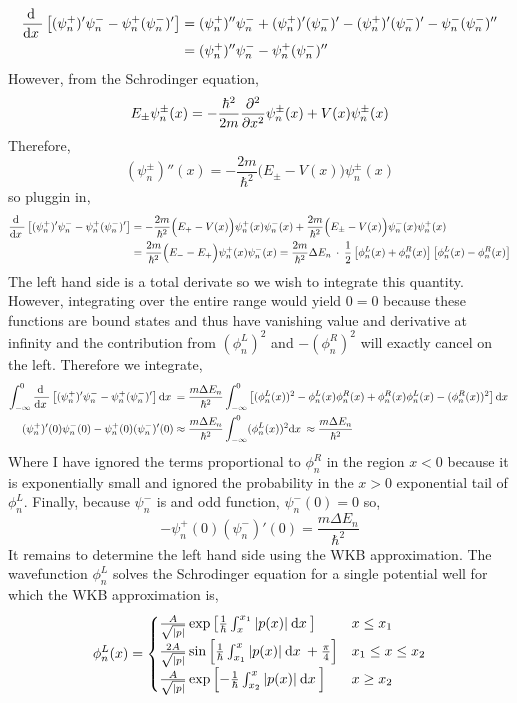 \documentclass[12pt]{extarticle}
\newcommand{\pL}{\phi^L_n}
\newcommand{\pR}{\phi^R_n}
\newcommand{\pspm}{\psi_{n}^{\pm}}
\newcommand{\psp}{\psi_{n}^{+}}
\newcommand{\psm}{\psi_{n}^{-}}
\newcommand{\dpsp}{(\psi_{n}^{+})'}
\newcommand{\dpsm}{(\psi_{n}^{-})'}
\newcommand{\ddpsp}{(\psi_{n}^{+})''}
\newcommand{\ddpsm}{(\psi_{n}^{-})''}
\begin{document}
\begin{align*}
\deriv{}{x} \left[ \dpsp \psm - \psp \dpsm \right] & = \ddpsp \psm + \dpsp \dpsm - \dpsp \dpsm - \psm \ddpsm \\ &= \ddpsp \psm - \psp \ddpsm 
\end{align*} 
However, from the Schrodinger equation,
\[ E_{\pm} \pspm(x) = - \frac{\hbar^2}{2m} \parsq{}{x} \pspm(x) + V(x) \pspm(x) \]
Therefore, 
\[ (\pspm)''(x) = - \frac{2m}{\hbar^2} \Big( E_{\pm} - V(x) \Big) \pspm(x)\]
so pluggin in,
\begin{align*}
\deriv{}{x} \left[ \dpsp \psm - \psp \dpsm \right] & = - \frac{2m}{\hbar^2} \Big( E_{+} - V(x) \Big) \psp(x) \psm(x) + \frac{2m}{\hbar^2} \Big( E_{\pm} - V(x) \Big) \psm(x) \psp(x) \\
& = \frac{2m}{\hbar^2} \Big( E_{-} - E_{+} \Big) \psp(x) \psm(x) = \frac{2m}{\hbar^2} \Delta E_n \: \cdot \: \frac{1}{2} \left[ \pL(x) + \pR(x) \right] \left[ \pL(x) - \pR(x) \right]
\end{align*} 
The left hand side is a total derivate so we wish to integrate this quantity. However, integrating over the entire range would yield $0 = 0$ because these functions are bound states and thus have vanishing value and derivative at infinity and the contribution from $(\pL)^2$ and $- (\pR)^2$ will exactly cancel on the left. Therefore we integrate,
\begin{align*}
\int_{-\infty}^{0} \deriv{}{x} \left[ \dpsp \psm - \psp \dpsm \right] \d{x} & = \frac{m \Delta E_n}{\hbar^2} \int_{-\infty}^{0} \left[(\pL(x))^2 - \pL(x) \pR(x) + \pR(x) \pL(x) - (\pR(x))^2 \right] \d{x} \\
\dpsp(0) \psm(0) - \psp(0) \dpsm(0) & \approx \frac{m \Delta E_n}{\hbar^2}  \int_{-\infty}^{0} (\pL(x))^2 \d{x} \approx \frac{m \Delta E_n}{\hbar^2} 
\end{align*}
Where I have ignored the terms proportional to $\pR$ in the region $x < 0$ because it is exponentially small and ignored the probability in the $x > 0$ exponential tail of $\pL$. Finally, because $\psm$ is and odd function, $\psm(0) = 0$ so,
\[- \psp(0) \dpsm(0) = \frac{m \Delta E_n}{\hbar^2} \]
It remains to determine the left hand side using the WKB approximation. The wavefunction $\pL$ solves the Schrodinger equation for a single potential well for which the WKB approximation is,
\[ \pL(x) = 
\begin{cases}
\frac{A}{\sqrt{|p|}} \exp \left[ \frac{1}{\hbar} \int_{x}^{x_1} |p(x)| \: \d{x} \right] & x \le x_1 \\
\frac{2A}{\sqrt{|p|}} \sin \left[ \frac{1}{\hbar} \int_{x_1}^{x} |p(x)| \: \d{x} + \frac{\pi}{4} \right] & x_1 \le x \le x_2 \\
\frac{A}{\sqrt{|p|}} \exp \left[ - \frac{1}{\hbar} \int_{x_2}^{x} |p(x)| \: \d{x} \right] & x \ge x_2 \\
\end{cases}\] 
\end{document}
